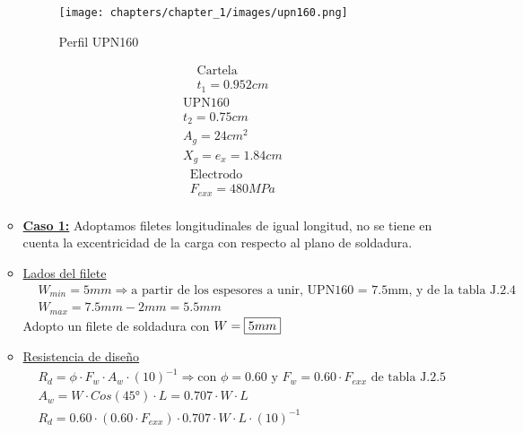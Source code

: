 \begin{enumerate}
\begin{itemize}
\begin{figure}[H]
\begin{center}
     \texttt{[image: chapters/chapter\_1/images/upn160.png]}
\end{center}
\caption{Perfil UPN160}
\end{figure}
\newpage
\begin{align*}
& \text{Cartela}\\
& t_1 = 0.952 cm
\end{align*}
\begin{align*}
& \text{UPN160}\\
& t_2 = 0.75 cm \\
& A_g = 24 cm^2 \\
& X_g = e_x = 1.84 cm
\end{align*}
\begin{align*}
& \text{Electrodo}\\
& F_{exx} = 480MPa\\
\end{align*}
\item \underline{\textbf{Caso 1:}}
Adoptamos filetes longitudinales de igual longitud, no se tiene en cuenta la excentricidad de la carga con respecto al plano de soldadura.\\
\item \underline{Lados del filete}
\begin{align*}
& W_{min} = 5mm \Rightarrow \text{a partir de los espesores a unir, UPN160 = 7.5mm, y de la tabla J.2.4}\\
& W_{max} = 7.5mm - 2mm = 5.5mm
\end{align*}
Adopto un filete de soldadura con $W = \framebox{$5 mm$}$\\

\item \underline{Resistencia de diseño}
\begin{align*}
& R_d = \phi \cdot F_w \cdot A_w \cdot (10)^{-1} \Rightarrow \text{con $\phi = 0.60$ y $F_w = 0.60 \cdot F_{exx}$ de tabla J.2.5}\\
& A_w = W \cdot Cos(45\text{°}) \cdot L = 0.707 \cdot W \cdot L \\
& R_d = 0.60 \cdot (0.60 \cdot F_{exx}) \cdot 0.707 \cdot W \cdot L \cdot (10)^{-1}
\end{align*}


\end{itemize}
\end{enumerate}
